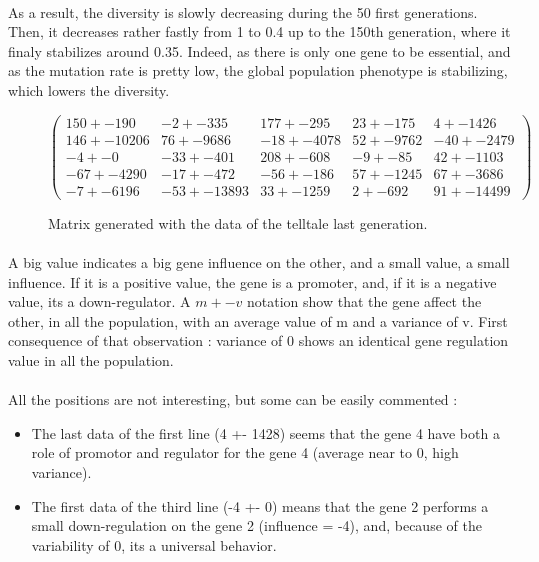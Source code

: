 \documentclass[]{report} %
\begin{document}
    \paragraph*{}
    As a result, the diversity is slowly decreasing during the 50 first generations. 
    Then, it decreases rather fastly from 1 to 0.4 up to the 150th generation, where it finaly stabilizes around 0.35. 
    Indeed, as there is only one gene to be essential, and as the mutation rate is pretty low, the global population phenotype is stabilizing, which lowers the diversity.

    \begin{figure}[H] 
            \centering
            \small
    $
            \begin{pmatrix}
                150 +- 190 & -2 +- 335 & 177 +- 295 & 23 +- 175 & 4 +- 1426 \\
                146 +- 10206 & 76 +- 9686 & -18 +- 4078 & 52 +- 9762 & -40 +- 2479 \\
                -4 +- 0 & -33 +- 401 & 208 +- 608 & -9 +- 85 & 42 +- 1103 \\
                -67 +- 4290 & -17 +- 472 & -56 +- 186 & 57 +- 1245 & 67 +- 3686 \\
                -7 +- 6196 & -53 +- 13893 & 33 +- 1259 & 2 +- 692 & 91 +- 1449 9 
            \end{pmatrix}
    $
            \caption{\footnotesize Matrix generated with the data of the telltale last generation.}
            \label{mat:telltale}
    \end{figure}
    \paragraph*{}
    A big value indicates a big gene influence on the other, and a small value, a small influence. If it is a positive value, the gene is a promoter, and, if it is a negative value, its a down-regulator.
    A $m +- v$ notation show that the gene affect the other, in all the population, with an average value of m and a variance of v.
    First consequence of that observation : variance of 0 shows an identical gene regulation value in all the population.
    \paragraph*{}
    All the positions are not interesting, but some can be easily commented :
    \begin{itemize}
            \item The last data of the first line (4 +- 1428) seems that the gene 4 have both a role of promotor and regulator for the gene 4 (average near to 0, high variance).
        \item The first data of the third line (-4 +- 0) means that the gene 2 performs a small down-regulation on the gene 2 (influence = -4), and, because of the variability of 0, its a universal behavior.
    \end{itemize}
\end{document}

